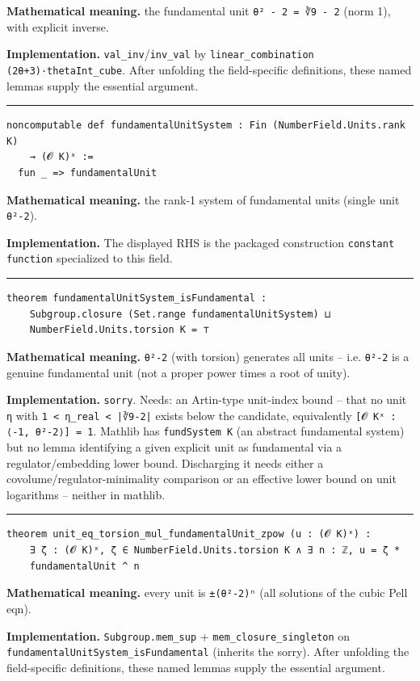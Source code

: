 \documentclass[UTF8,a4paper,11pt,fontset=fandol]{ctexart}
\theoremstyle{definition}
\newcommand{\statementsep}{\par\medskip\hrule\medskip}
\begin{document}
\noindent\textbf{Mathematical meaning.} the fundamental unit \texttt{θ² - 2 = ∛9 - 2} (norm 1), with explicit inverse.\par
\noindent\textbf{Implementation.} \texttt{val\_\allowbreak{}inv}/\texttt{inv\_\allowbreak{}val} by \texttt{linear\_\allowbreak{}combination (2θ+3)·thetaInt\_\allowbreak{}cube}. After unfolding the field-specific definitions, these named lemmas supply the essential argument.\par
\statementsep
\begin{verbatim}
noncomputable def fundamentalUnitSystem : Fin (NumberField.Units.rank K)
    → (𝓞 K)ˣ :=
  fun _ => fundamentalUnit
\end{verbatim}
\noindent\textbf{Mathematical meaning.} the rank-1 system of fundamental units (single unit \texttt{θ²-2}).\par
\noindent\textbf{Implementation.} The displayed RHS is the packaged construction \texttt{constant function} specialized to this field.\par
\statementsep
\begin{verbatim}
theorem fundamentalUnitSystem_isFundamental :
    Subgroup.closure (Set.range fundamentalUnitSystem) ⊔
    NumberField.Units.torsion K = ⊤
\end{verbatim}
\noindent\textbf{Mathematical meaning.} \texttt{θ²-2} (with torsion) generates all units -- i.e. \texttt{θ²-2} is a genuine fundamental unit (not a proper power times a root of unity).\par
\noindent\textbf{Implementation.} \texttt{sorry}. Needs: an Artin-type unit-index bound -- that no unit \texttt{η} with \texttt{1 < η\_\allowbreak{}real < |∛9-2|} exists below the candidate, equivalently \texttt{[𝓞 Kˣ : ⟨-1, θ²-2⟩] = 1}. Mathlib has \texttt{fundSystem K} (an abstract fundamental system) but no lemma identifying a given explicit unit as fundamental via a regulator/embedding lower bound. Discharging it needs either a covolume/regulator-minimality comparison or an effective lower bound on unit logarithms -- neither in mathlib.\par
\statementsep
\begin{verbatim}
theorem unit_eq_torsion_mul_fundamentalUnit_zpow (u : (𝓞 K)ˣ) :
    ∃ ζ : (𝓞 K)ˣ, ζ ∈ NumberField.Units.torsion K ∧ ∃ n : ℤ, u = ζ *
    fundamentalUnit ^ n
\end{verbatim}
\noindent\textbf{Mathematical meaning.} every unit is \texttt{±(θ²-2)ⁿ} (all solutions of the cubic Pell eqn).\par
\noindent\textbf{Implementation.} \texttt{Subgroup.\allowbreak{}mem\_\allowbreak{}sup} + \texttt{mem\_\allowbreak{}closure\_\allowbreak{}singleton} on \texttt{fundamentalUnitSystem\_\allowbreak{}isFundamental} (inherits the sorry). After unfolding the field-specific definitions, these named lemmas supply the essential argument.\par
\end{document}
